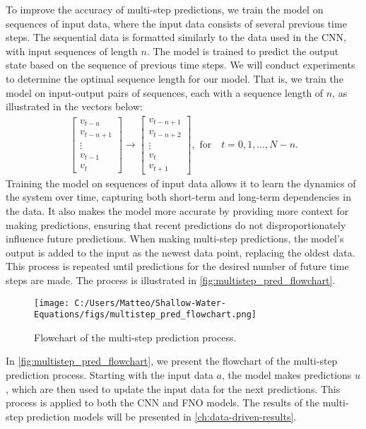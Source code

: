 To improve the accuracy of multi-step predictions, we train the model on sequences of input data, where the input data consists of several previous time steps.
The sequential data is formatted similarly to the data used in the CNN, with input sequences of length $n$.
The model is trained to predict the output state based on the sequence of previous time steps.
We will conduct experiments to determine the optimal sequence length for our model.
That is, we train the model on input-output pairs of sequences, each with a sequence length of $n$, as illustrated in the vectors below:
\begin{align*}
    \begin{bmatrix}
        v_{t-n} \\ v_{t-n+1} \\ \vdots \\ v_{t-1} \\ v_t
    \end{bmatrix}
    \to
    \begin{bmatrix}
        v_{t-n+1} \\ v_{t-n+2} \\ \vdots \\ v_{t} \\ v_{t+1}
    \end{bmatrix},
    \text{ for} \quad t = 0, 1, \ldots, N-n.
\end{align*}
Training the model on sequences of input data allows it to learn the dynamics of the system over time, capturing both short-term and long-term dependencies in the data.
It also makes the model more accurate by providing more context for making predictions, ensuring that recent predictions do not disproportionately influence future predictions.
When making multi-step predictions, the model's output is added to the input as the newest data point, replacing the oldest data.
This process is repeated until predictions for the desired number of future time steps are made.
The process is illustrated in \autoref{fig:multistep_pred_flowchart}.
\begin{figure}[H]
    \centering
    \texttt{[image: C:/Users/Matteo/Shallow-Water-Equations/figs/multistep\_pred\_flowchart.png]}
    \caption{Flowchart of the multi-step prediction process.}\label{fig:multistep_pred_flowchart}
\end{figure}
In \autoref{fig:multistep_pred_flowchart}, we present the flowchart of the multi-step prediction process.
Starting with the input data $a$, the model makes predictions $u$, which are then used to update the input data for the next predictions.
This process is applied to both the CNN and FNO models.
The results of the multi-step prediction models will be presented in \autoref{ch:data-driven-results}.

